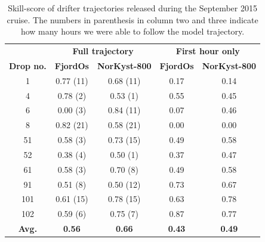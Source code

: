 \begin{table}[htb]
  \begin{center}
    \begin{tabular}{ | c | c | c | c | c |}
    \hline
                     & \multicolumn{2}{|c|}{\bf \small{Full trajectory}}  & \multicolumn{2}{|c|}{\bf \small{First hour only}} \\ 
      {\bf Drop no.} & {\bf FjordOs} & {\bf NorKyst-800} & {\bf FjordOs} & {\bf NorKyst-800}\\ \hline
      1 	     & 0.77 (11)     & 0.68 (11)         & 0.17		 & 0.14 \\ 
      4 	     & 0.78 (2)      & 0.53 (1)		 & 0.55		 & 0.45 \\
      6 & 0.00 (3)  & 0.84 (11) & 0.07 & 0.46 \\
      8 & 0.82 (21) & 0.58 (21) & 0.00 & 0.00 \\
     51 & 0.58 (3)  & 0.73 (15) & 0.49 & 0.58 \\
     52 & 0.38 (4)  & 0.50 (1)  & 0.37 & 0.47 \\
     61 & 0.58 (3)  & 0.70 (8)  & 0.49 & 0.58 \\
     91 & 0.51 (8)  & 0.50 (12) & 0.73 & 0.67 \\
    101 & 0.61 (15) & 0.78 (15) & 0.63 & 0.78 \\
    102 & 0.59 (6)  & 0.75 (7)  & 0.87 & 0.77 \\ \hline
    {\bf Avg.}      & {\bf 0.56}     & {\bf 0.66}	 & {\bf 0.43}	 & {\bf 0.49}\\
    \hline
    \end{tabular}
    \caption{\small Skill-score of drifter trajectories released during the September 2015 cruise. The numbers in parenthesis in column two and three indicate how many hours we were able to follow the model trajectory.}
    \label{tab:skillscore_full}
  \end{center}
\end{table}

